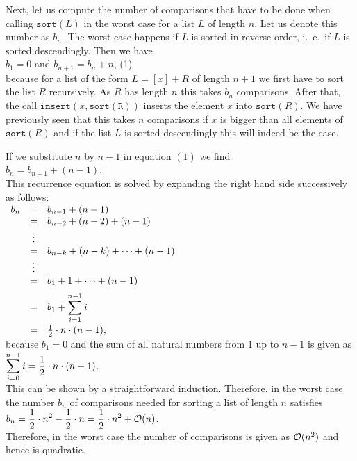 Next, let us compute the number of comparisons that have to be done when calling
$\texttt{sort}(L)$ in the worst case for a list  $L$ of length $n$.  Let us denote this number as
$b_n$. The worst case happens if $L$ is sorted in reverse order, i.~e.~if $L$ is sorted
descendingly.   
Then we have \\[0.2cm]
\hspace*{1.3cm}
 $b_1 = 0$ \quad and \quad $b_{n+1} = b_n + n$, \hspace*{\fill} (1)
\\[0.2cm]
because for a list of the form $L = [x] + R$ of length $n+1$ we first have to sort the list $R$
recursively.  As $R$ has length $n$ this takes $b_n$ comparisons.  After that, the call
$\mathtt{insert}(x, \mathtt{sort(R)})$ 
inserts the element $x$ into $\mathtt{sort}(R)$.  We have previously seen that this takes $n$
comparisons if $x$ is bigger than all elements of $\mathtt{sort}(R)$ and if the list $L$ is sorted
descendingly this will indeed be the case.

If we substitute $n$ by $n-1$ in equation $(1)$ we find
\\[0.2cm]
\hspace*{1.3cm}
$b_n = b_{n-1} + (n - 1)$.
\\[0.2cm]
This recurrence equation is solved by expanding the right hand side successively as follows:
\\[0.2cm]
\hspace*{1.3cm}
$
\begin{array}[t]{lcl}
  b_{n} & = & b_{n-1} + (n - 1)                     \\ 
        & = & b_{n-2} + (n - 2) + (n - 1)           \\ 
        & \vdots &                                  \\
        & = & b_{n-k} + (n - k) + \cdots + (n - 1)  \\ 
        & \vdots &                                  \\
        & = & b_{1} + 1 + \cdots + (n - 1)      \\[0.2cm] 
        & = & \displaystyle b_{1} + \sum\limits_{i = 1}^{n - 1} i \\[0.4cm]
        & = & \frac{1}{2} \cdot n \cdot (n - 1),
\end{array}
$
\\[0.2cm]
because $b_1 = 0$ and the sum of all natural numbers from 1 up to  $n - 1$ is given as
\\[0.2cm]
\hspace*{1.3cm}
$\displaystyle\sum\limits_{i = 0}^{n - 1} i  = \frac{1}{2} \cdot n \cdot (n - 1)$.
\\[0.2cm]
This can be shown by a straightforward induction.  Therefore, in the worst case the number $b_n$ of
comparisons needed for sorting a list of length $n$  satisfies 
\\[0.2cm]
\hspace*{1.3cm}
$\displaystyle b_n = \frac{1}{2} \cdot n^2 - \frac{1}{2} \cdot n = \frac{1}{2} \cdot n^2 + \mathcal{O}(n)$.
\\[0.2cm]
Therefore, in the worst case the number of comparisons is given as $\mathcal{O}(n^2)$ and hence
 is quadratic.


